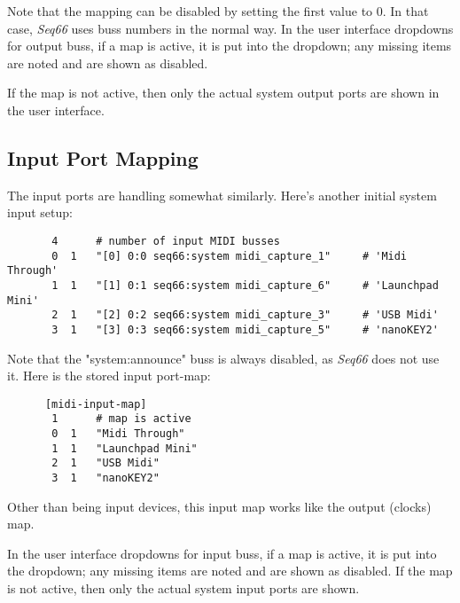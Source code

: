    Note that the mapping can be disabled by setting the first value to 0.  In
   that case, \textsl{Seq66} uses buss numbers in the normal way.
   In the user interface dropdowns for output buss, if a map is active, it is
   put into the dropdown; any missing items are noted and are shown as
   disabled.


   If the map is not active, then only the actual system output ports are
   shown in the user interface.

\subsection{Input Port Mapping}
\label{subsec:input_port_mapping}

   The input ports are handling somewhat similarly.  Here's another
   initial system input setup:

   \begin{verbatim}
       4      # number of input MIDI busses
       0  1   "[0] 0:0 seq66:system midi_capture_1"     # 'Midi Through'
       1  1   "[1] 0:1 seq66:system midi_capture_6"     # 'Launchpad Mini'
       2  1   "[2] 0:2 seq66:system midi_capture_3"     # 'USB Midi'
       3  1   "[3] 0:3 seq66:system midi_capture_5"     # 'nanoKEY2'
   \end{verbatim}

   Note that the "system:announce" buss is always disabled, as \textsl{Seq66}
   does not use it.  Here is the stored input port-map:

   \begin{verbatim}
      [midi-input-map]
       1      # map is active
       0  1   "Midi Through"
       1  1   "Launchpad Mini"
       2  1   "USB Midi"
       3  1   "nanoKEY2"
   \end{verbatim}

   Other than being input devices, this input map works like the output
   (clocks) map.

   In the user interface dropdowns for input buss, if a map is active, it is
   put into the dropdown; any missing items are noted and are shown as
   disabled.
   If the map is not active, then only the actual system input ports are shown.

